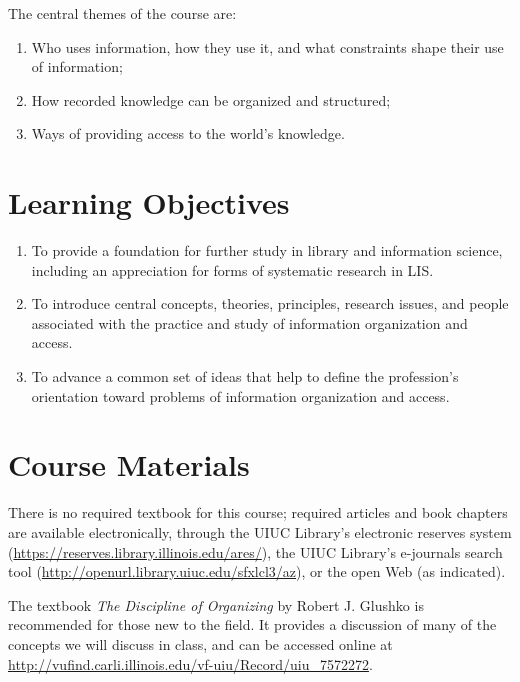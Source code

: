 \documentclass[]{article}
\providecommand{\tightlist}{%
  \setlength{\itemsep}{0pt}\setlength{\parskip}{0pt}}
\begin{document}
The central themes of the course are:

\begin{enumerate}
\def\labelenumi{\arabic{enumi}.}
\tightlist
\item
  Who uses information, how they use it, and what constraints shape
  their use of information;
\item
  How recorded knowledge can be organized and structured;\\
\item
  Ways of providing access to the world's knowledge.
\end{enumerate}

\section{Learning Objectives}\label{learning-objectives}

\begin{enumerate}
\def\labelenumi{\arabic{enumi}.}
\tightlist
\item
  To provide a foundation for further study in library and information
  science, including an appreciation for forms of systematic research in
  LIS.
\item
  To introduce central concepts, theories, principles, research issues,
  and people associated with the practice and study of information
  organization and access.
\item
  To advance a common set of ideas that help to define the profession's
  orientation toward problems of information organization and access.
\end{enumerate}

\section{Course Materials}\label{course-materials}

There is no required textbook for this course; required articles and
book chapters are available electronically, through the UIUC Library's
electronic reserves system
(\url{https://reserves.library.illinois.edu/ares/}), the UIUC Library's
e-journals search tool
(\url{http://openurl.library.uiuc.edu/sfxlcl3/az}), or the open Web (as
indicated).

The textbook \emph{The Discipline of Organizing} by Robert J. Glushko is
recommended for those new to the field. It provides a discussion of many
of the concepts we will discuss in class, and can be accessed online at
\url{http://vufind.carli.illinois.edu/vf-uiu/Record/uiu_7572272}.
\end{document}
